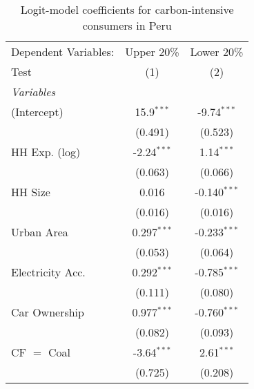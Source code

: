 
\begin{table}[htbp!]
   \centering
   \small
   \begin{adjustbox}{width = 1\textwidth, max height = 0.95\textheight, center}
      \begin{threeparttable}[b]
         \caption{\label{tab:Logit_1_PER} Logit-model coefficients for carbon-intensive consumers in Peru}
         \begin{tabular}{lcc}
            \tabularnewline \midrule \midrule
            Dependent Variables:                          & Upper 20\%    & Lower 20\%\\   
            Test                                          & (1)           & (2)\\  
            \midrule
            \emph{Variables}\\
            (Intercept)                                   & 15.9$^{***}$  & -9.74$^{***}$\\   
                                                          & (0.491)       & (0.523)\\   
            HH Exp. (log)                                 & -2.24$^{***}$ & 1.14$^{***}$\\   
                                                          & (0.063)       & (0.066)\\   
            HH Size                                       & 0.016         & -0.140$^{***}$\\   
                                                          & (0.016)       & (0.016)\\   
            Urban Area                                    & 0.297$^{***}$ & -0.233$^{***}$\\   
                                                          & (0.053)       & (0.064)\\   
            Electricity Acc.                              & 0.292$^{***}$ & -0.785$^{***}$\\   
                                                          & (0.111)       & (0.080)\\   
            Car Ownership                                 & 0.977$^{***}$ & -0.760$^{***}$\\   
                                                          & (0.082)       & (0.093)\\   
            CF $=$ Coal                                   & -3.64$^{***}$ & 2.61$^{***}$\\   
                                                          & (0.725)       & (0.208)\\   

\end{tabular}
\end{threeparttable}
\end{adjustbox}
\end{table}
